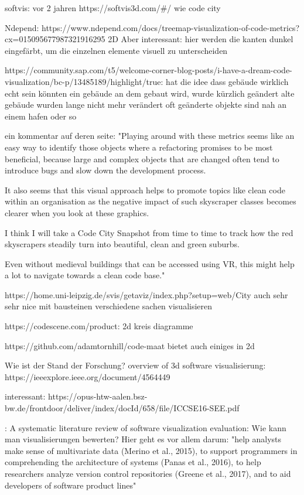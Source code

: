 softvis:
vor 2 jahren
https://softvis3d.com/#/
wie code city


Ndepend:
https://www.ndepend.com/docs/treemap-visualization-of-code-metrics?cx=015095677987321916295%
2D
Aber interessant: hier werden die kanten dunkel eingefärbt, um die einzelnen elemente visuell zu unterscheiden


https://community.sap.com/t5/welcome-corner-blog-posts/i-have-a-dream-code-visualization/bc-p/13485189/highlight/true:
hat die idee dass gebäude wirklich echt sein könnten
ein gebäude an dem gebaut wird, wurde kürzlich geändert
alte gebäude wurden lange nicht mehr verändert
oft geänderte objekte sind nah an einem hafen oder so

ein kommentar auf deren seite:
"Playing around with these metrics seems like an easy way to identify those objects where a refactoring promises to be most beneficial, because large and complex objects that are changed often tend to introduce bugs and slow down the development process.

It also seems that this visual approach helps to promote topics like clean code within an organisation as the negative impact of such skyscraper classes becomes clearer when you look at these graphics.

I think I will take a Code City Snapshot from time to time to track how the red skyscrapers steadily turn into beautiful, clean and green suburbs.

Even without medieval buildings that can be accessed using VR, this might help a lot to navigate towards a clean code base."


https://home.uni-leipzig.de/svis/getaviz/index.php?setup=web/City%
auch sehr sehr nice
mit bausteinen verschiedene sachen visualisieren


https://codescene.com/product:
2d kreis diagramme

https://github.com/adamtornhill/code-maat
bietet auch einiges in 2d

Wie ist der Stand der Forschung?
overview of 3d software visualisierung: https://ieeexplore.ieee.org/document/4564449

interessant: https://opus-htw-aalen.bsz-bw.de/frontdoor/deliver/index/docId/658/file/ICCSE16-SEE.pdf

\cite{MERINO2018165}:
A systematic literature review of software visualization evaluation:
Wie kann man visualisierungen bewerten?
Hier geht es vor allem darum: "help analysts make sense of multivariate data
(Merino et al., 2015), to support programmers in comprehending the
architecture of systems (Panas et al., 2016), to help researchers analyze
version control repositories (Greene et al., 2017), and to aid developers
of software product lines"


